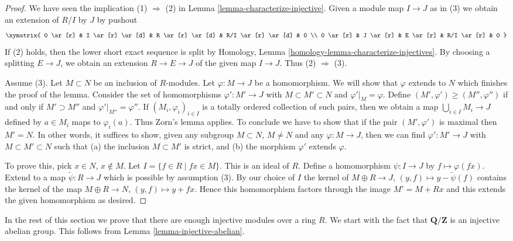 \begin{proof}
We have seen the implication (1) $\Rightarrow$ (2) in
Lemma \ref{lemma-characterize-injective}. Given a module map $I \to J$
as in (3) we obtain an extension of $R/I$ by $J$ by pushout
$$
\xymatrix{
0 \ar[r] &
I \ar[r] \ar[d] &
R \ar[r] \ar[d] &
R/I \ar[r] \ar[d] & 0 \\
0 \ar[r] &
J \ar[r] &
E \ar[r] &
R/I \ar[r] & 0
}
$$
If (2) holds, then the lower short exact sequence is split by
Homology, Lemma \ref{homology-lemma-characterize-injectives}.
By choosing a splitting $E \to J$, we obtain an extension
$R \to E \to J$ of the given map $I \to J$. Thus (2) $\Rightarrow$ (3).

\medskip\noindent
Assume (3). Let $M \subset N$ be an inclusion of $R$-modules.
Let $\varphi : M \to J$ be a homomorphism. We will show that $\varphi$
extends to $N$ which finishes the proof of the lemma.
Consider the set of homomorphisms $\varphi' : M' \to J$
with $M \subset M' \subset N$ and $\varphi'|_M = \varphi$.
Define $(M', \varphi') \geq (M'', \varphi'')$ if
and only if $M' \supset M''$ and $\varphi'|_{M''} = \varphi''$.
If $(M_i, \varphi_i)_{i \in I}$ is a totally
ordered collection of such pairs, then we obtain a map
$\bigcup_{i \in I} M_i \to J$ defined by $a \in M_i$
maps to $\varphi_i(a)$. Thus Zorn's lemma applies.
To conclude we have to show that if the pair
$(M', \varphi')$ is maximal then $M' = N$.
In other words, it suffices to show, given
any subgroup $M \subset N$, $M \not = N$ and
any $\varphi : M \to J$, then we can find
$\varphi' : M' \to J$ with $M \subset M' \subset N$
such that (a) the inclusion $M \subset M'$ is strict, and
(b) the morphism $\varphi'$ extends $\varphi$.

\medskip\noindent
To prove this, pick $x \in N$, $x \not \in M$.
Let $I = \{f \in R \mid fx \in M\}$. This is an ideal of $R$.
Define a homomorphism $\psi : I \to J$ by $f \mapsto \varphi(fx)$.
Extend to a map $\tilde\psi : R \to J$ which is possible by assumption (3).
By our choice of $I$ the kernel of
$M \oplus R \to J$, $(y, f) \mapsto y - \tilde\psi(f)$
contains the kernel of the map $M \oplus R \to N$,
$(y, f) \mapsto y + fx$. Hence this homomorphism factors
through the image $M' = M + Rx$ and this extends the given homomorphism
as desired.
\end{proof}

\noindent
In the rest of this section we prove that there are enough injective
modules over a ring $R$. We start with the fact that $\mathbf{Q}/\mathbf{Z}$
is an injective abelian group. This follows from
Lemma \ref{lemma-injective-abelian}.

